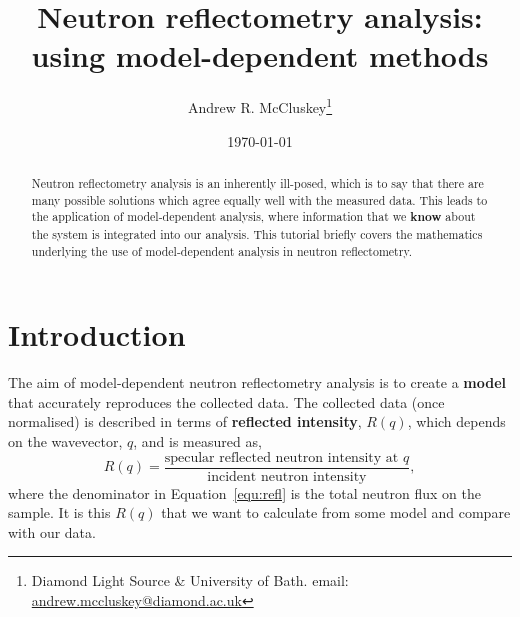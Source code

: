 \documentclass[twoside,symmetric]{tufte-handout}
\begin{document}
\title{Neutron reflectometry analysis: using model-dependent methods}


\author{%
    Andrew R. McCluskey\thanks{Diamond Light Source \& University of Bath. email: \href{mailto:andrew.mccluskey@diamond.ac.uk}{andrew.mccluskey@diamond.ac.uk}}}
  
\date{\today}

\maketitle

\begin{abstract}
\noindent
Neutron reflectometry analysis is an inherently ill-posed, which is to say that there are many possible solutions which agree equally well with the measured data. 
This leads to the application of model-dependent analysis, where information that we \textbf{know} about the system is integrated into our analysis. 
This tutorial briefly covers the mathematics underlying the use of model-dependent analysis in neutron reflectometry. 
\end{abstract}

\section{Introduction}

The aim of model-dependent neutron reflectometry analysis is to create a \textbf{model} that accurately reproduces the collected data.\cite{lovell_analysis_1999} 
The collected data (once normalised) is described in terms of \textbf{reflected intensity}, $R(q)$, which depends on the wavevector, $q$, and is measured as, 
%
\begin{equation}
    R(q) = \frac{\text{specular reflected neutron intensity at $q$}}{\text{incident neutron intensity}},
    \label{equ:refl}
\end{equation}
%
where the denominator in Equation~\ref{equ:refl} is the total neutron flux on the sample.
It is this $R(q)$ that we want to calculate from some model and compare with our data. 
\end{document}
